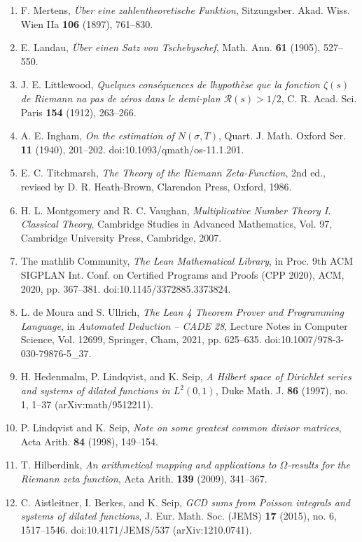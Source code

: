 \documentclass[11pt]{article}
\providecommand{\tightlist}{\setlength{\itemsep}{0pt}\setlength{\parskip}{0pt}}
\begin{document}
\begin{enumerate}
\def\labelenumi{\arabic{enumi}.}
\tightlist
\item
  F. Mertens, \emph{Über eine zahlentheoretische Funktion}, Sitzungsber. Akad. Wiss. Wien IIa \textbf{106} (1897), 761--830.
\item
  E. Landau, \emph{Über einen Satz von Tschebyschef}, Math. Ann. \textbf{61} (1905), 527--550.
\item
  J. E. Littlewood, \emph{Quelques conséquences de l\textquotesingle hypothèse que la fonction \(\zeta(s)\) de Riemann n\textquotesingle a pas de zéros dans le demi-plan \(\mathcal{R}(s) > 1/2\)}, C. R. Acad. Sci. Paris \textbf{154} (1912), 263--266.
\item
  A. E. Ingham, \emph{On the estimation of \(N(\sigma, T)\)}, Quart. J. Math. Oxford Ser. \textbf{11} (1940), 201--202. doi:10.1093/qmath/os-11.1.201.
\item
  E. C. Titchmarsh, \emph{The Theory of the Riemann Zeta-Function}, 2nd ed., revised by D. R. Heath-Brown, Clarendon Press, Oxford, 1986.
\item
  H. L. Montgomery and R. C. Vaughan, \emph{Multiplicative Number Theory I. Classical Theory}, Cambridge Studies in Advanced Mathematics, Vol. 97, Cambridge University Press, Cambridge, 2007.
\item
  The mathlib Community, \emph{The Lean Mathematical Library}, in Proc. 9th ACM SIGPLAN Int. Conf. on Certified Programs and Proofs (CPP 2020), ACM, 2020, pp. 367--381. doi:10.1145/3372885.3373824.
\item
  L. de Moura and S. Ullrich, \emph{The Lean 4 Theorem Prover and Programming Language}, in \emph{Automated Deduction -- CADE 28}, Lecture Notes in Computer Science, Vol. 12699, Springer, Cham, 2021, pp. 625--635. doi:10.1007/978-3-030-79876-5\_37.
\item
  H. Hedenmalm, P. Lindqvist, and K. Seip, \emph{A Hilbert space of Dirichlet series and systems of dilated functions in \(L^2(0,1)\)}, Duke Math. J. \textbf{86} (1997), no. 1, 1--37 (arXiv:math/9512211).
\item
  P. Lindqvist and K. Seip, \emph{Note on some greatest common divisor matrices}, Acta Arith. \textbf{84} (1998), 149--154.
\item
  T. Hilberdink, \emph{An arithmetical mapping and applications to \(\Omega\)-results for the Riemann zeta function}, Acta Arith. \textbf{139} (2009), 341--367.
\item
  C. Aistleitner, I. Berkes, and K. Seip, \emph{GCD sums from Poisson integrals and systems of dilated functions}, J. Eur. Math. Soc. (JEMS) \textbf{17} (2015), no. 6, 1517--1546. doi:10.4171/JEMS/537 (arXiv:1210.0741).

\end{enumerate}
\end{document}
